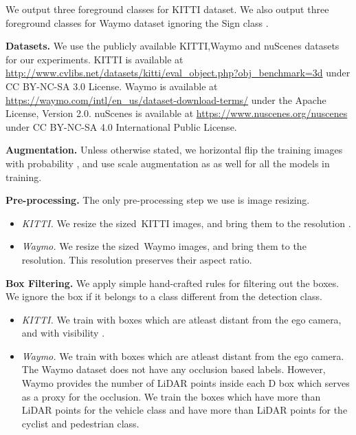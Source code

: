 \documentclass[runningheads]{llncs}
\newcommand{\threeD}{D}
\newcommand{\lidar}{LiDAR}
\newcommand{\kitti}{KITTI}
\newcommand{\nuscenes}{nuScenes}
\newcommand{\waymo}{Waymo}
\newcommand{\noIndentHeading}[1]{\noindent\textbf{#1}}
\begin{document}
            We output three foreground classes for \kitti{} dataset. 
            We also output three foreground classes for \waymo{} dataset ignoring the Sign class \cite{reading2021categorical}.

\noIndentHeading{Datasets.}
            We use the publicly available \kitti{},\waymo{} and \nuscenes{} datasets for our experiments.
            \kitti{} is available at \url{http://www.cvlibs.net/datasets/kitti/eval_object.php?obj_benchmark=3d} under CC BY-NC-SA 3.0 License.
            \waymo{} is available at \url{https://waymo.com/intl/en_us/dataset-download-terms/} under the Apache License, Version 2.0.
            \nuscenes{} is available at \url{https://www.nuscenes.org/nuscenes} under 
CC BY-NC-SA 
            4.0 International Public License.

\noIndentHeading{Augmentation.}
            Unless otherwise stated, we horizontal flip the training images with probability , and use scale augmentation as  as well for all the models \cite{lu2021geometry} in training.

\noIndentHeading{Pre-processing.}
            The only pre-processing step we use is image resizing.
            \begin{itemize}
                \item \textit{\kitti{}.}
            We resize the  sized~\kitti{} images, and bring them to the  resolution \cite{lu2021geometry}.
            
                \item \textit{\waymo{}.}
            We resize the  sized~\waymo{} images, and bring them to the  resolution. This resolution preserves their aspect ratio. 
            \end{itemize}
        
\noIndentHeading{Box Filtering.}
            We apply simple hand-crafted rules for filtering out the boxes. 
            We ignore the box if it belongs to a class different from the detection class.
            \begin{itemize}
                \item \textit{\kitti{}.} 
                We train with boxes which are atleast  distant from the ego camera, and with visibility  \cite{lu2021geometry}. 
            
                \item \textit{\waymo{}.} 
                We train with boxes which are atleast  distant from the ego camera.
                The \waymo{} dataset does not have any occlusion based labels. 
                However, \waymo{} provides the number of \lidar{}  points inside each \threeD{} box which serves as a proxy for the occlusion.
                We train the boxes which have more than  \lidar{} points for the vehicle class and have more than  \lidar{} points for the cyclist and pedestrian class. 
\end{itemize}
\end{document}
